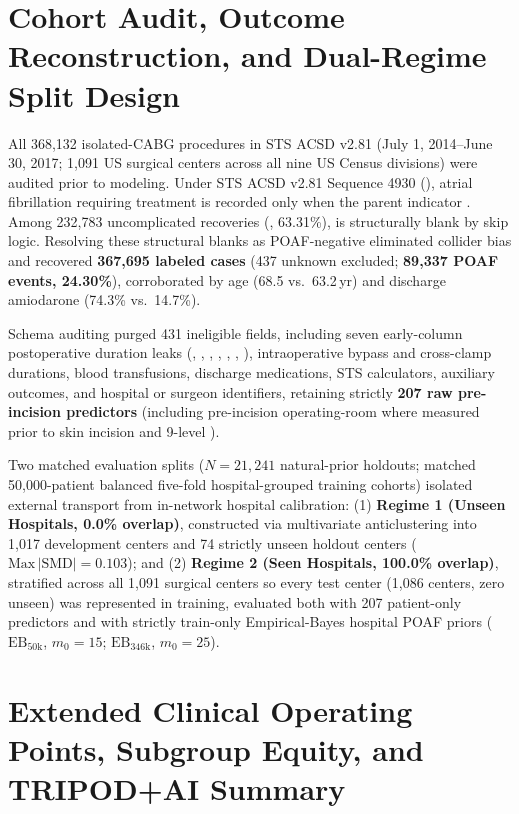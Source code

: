 \section{Cohort Audit, Outcome Reconstruction, and Dual-Regime Split Design}

All 368,132 isolated-CABG procedures in STS ACSD v2.81 (July 1, 2014--June 30, 2017; 1,091 US surgical centers across all nine US Census divisions) were audited prior to modeling. Under STS ACSD v2.81 Sequence 4930 (), atrial fibrillation requiring treatment is recorded only when the parent indicator .\cite{sts2014v281} Among 232,783 uncomplicated recoveries (, 63.31\%),  is structurally blank by skip logic. Resolving these structural blanks as POAF-negative eliminated collider bias\cite{hernan2020causal} and recovered \textbf{367,695 labeled cases} (437 unknown excluded; \textbf{89,337 POAF events, 24.30\%}), corroborated by age (68.5 vs.\ 63.2\,yr) and discharge amiodarone (74.3\% vs.\ 14.7\%).

Schema auditing purged 431 ineligible fields, including seven early-column postoperative duration leaks (, , , , , , ), intraoperative bypass and cross-clamp durations, blood transfusions, discharge medications, STS calculators, auxiliary outcomes, and hospital or surgeon identifiers, retaining strictly \textbf{207 raw pre-incision predictors} (including pre-incision operating-room  where measured prior to skin incision and 9-level ).

Two matched evaluation splits ($N{=}21{,}241$ natural-prior holdouts; matched 50,000-patient balanced five-fold hospital-grouped training cohorts) isolated external transport from in-network hospital calibration: (1) \textbf{Regime 1 (Unseen Hospitals, 0.0\% overlap)}, constructed via multivariate anticlustering into 1,017 development centers and 74 strictly unseen holdout centers ($\mathrm{Max}\,|\mathrm{SMD}|=0.103$);\cite{papenberg2021anticlustering,joseph2022split} and (2) \textbf{Regime 2 (Seen Hospitals, 100.0\% overlap)}, stratified across all 1,091 surgical centers so every test center (1,086 centers, zero unseen) was represented in training, evaluated both with 207 patient-only predictors and with strictly train-only Empirical-Bayes hospital POAF priors ($\mathrm{EB}_{50\mathrm{k}}$, $m_0{=}15$; $\mathrm{EB}_{346\mathrm{k}}$, $m_0{=}25$).

\section{Extended Clinical Operating Points, Subgroup Equity, and TRIPOD+AI Summary}





